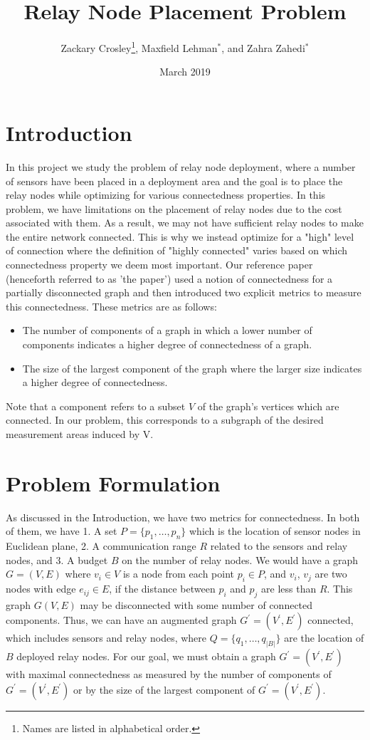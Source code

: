 \documentclass{article}
\title{Relay Node Placement Problem}
\author{Zackary Crosley\thanks{Names are listed in alphabetical order.}, Maxfield Lehman$^*$, and Zahra Zahedi$^*$}
\date{March 2019}
\begin{document}
\maketitle

\section{Introduction}
In this project we study the problem of relay node deployment, where a number of sensors have been placed in a deployment area and the goal is to place the relay nodes while optimizing for various connectedness properties. In this problem, we have limitations on the placement of relay nodes due to the cost associated with them. As a result, we may not have sufficient relay nodes to make the entire network connected. This is why we instead optimize for a "high" level of connection where the definition of "highly connected" varies based on which connectedness property we deem most important. Our reference paper \cite{relay-node} (henceforth referred to as 'the paper') used a notion of connectedness for a partially disconnected graph and then introduced two explicit metrics to measure this connectedness. These metrics are as follows:
\begin{itemize}
    \item The number of components of a graph in which a lower number of components indicates a higher degree of connectedness of a graph.
    \item The size of the largest component of the graph where the larger size indicates a higher degree of connectedness.
\end{itemize}
Note that a component refers to a subset $V$ of the graph's vertices which are connected. In our problem, this corresponds to a subgraph of the desired measurement areas induced by V.

\section{Problem Formulation}
As discussed in the Introduction, we have two metrics for connectedness. In both of them, we have 1. A set $P=\{p_1, \hdots, p_n\}$ which is the location of sensor nodes in Euclidean plane, 2. A communication range $R$ related to the sensors and relay nodes, and 3. A budget $B$  on the number of relay nodes. We would have a graph $G=(V,E)$ where $v_i\in V$ is a node from each point $p_i\in P$, and $v_i$, $v_j$ are two nodes with edge $e_{ij}\in E$, if the distance between $p_i$ and $p_j$ are less than $R$. This graph $G(V, E)$ may be disconnected with some number of connected components. Thus, we can have an augmented graph $G^\prime=(V^\prime, E^\prime)$ connected, which includes sensors and relay nodes, where $Q=\{q_1, \hdots, q_{|B|}\}$ are the location of $B$ deployed relay nodes. For our goal, we must obtain a graph $G^\prime=(V^\prime, E^\prime)$ with maximal connectedness as measured by the number of components of $G^\prime=(V^\prime, E^\prime)$ or by the size of the largest component of $G^\prime=(V^\prime, E^\prime)$.
\end{document}
